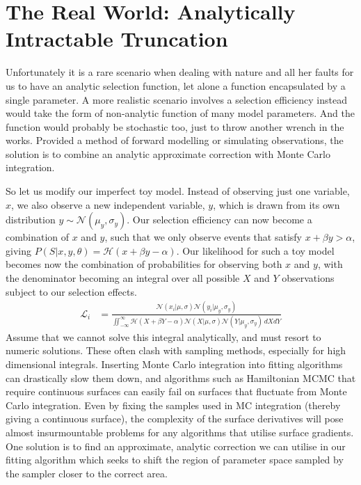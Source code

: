 \documentclass[a4paper,fleqn,usenatbib]{mnras}
\begin{document}
\section{The Real World: Analytically Intractable Truncation}
\label{sec:real}
Unfortunately it is a rare scenario when dealing with nature and all her faults for us to have an analytic selection function, let alone a function encapsulated by a single parameter. A more realistic scenario involves a selection efficiency instead would take the form of non-analytic function of many model parameters. And the function would probably be stochastic too, just to throw another wrench in the works. Provided a method of forward modelling or simulating observations, the solution is to combine an analytic approximate correction with Monte Carlo integration.

So let us modify our imperfect toy model. Instead of observing just one variable, $x$, we also observe a new independent variable, $y$, which is drawn from its own distribution $y \sim \mathcal{N}(\mu_y, \sigma_y)$. Our selection efficiency can now become a combination of $x$ and $y$, such that we only observe events that satisfy $x + \beta y > \alpha$, giving $P(S|x,y,\theta) = \mathcal{H}(x + \beta y - \alpha)$.  Our likelihood for such a toy model becomes now the combination of probabilities for observing both $x$ and $y$, with the denominator becoming an integral over all possible $X$ and $Y$ observations subject to our selection effects.
\begin{align}
\mathcal{L}_i &= \frac{ \mathcal{N}(x_i|\mu, \sigma) \mathcal{N}(y_i|\mu_y, \sigma_y)}
{\iint_{-\infty}^\infty \mathcal{H}(X + \beta Y - \alpha) \mathcal{N}(X|\mu, \sigma) \mathcal{N}(Y|\mu_y, \sigma_y)\, dX dY}
\end{align}
Assume that we cannot solve this integral analytically, and must resort to numeric solutions. These often clash with sampling methods, especially for high dimensional integrals. Inserting Monte Carlo integration into fitting algorithms can drastically slow them down, and algorithms such as Hamiltonian MCMC that require continuous surfaces can easily fail on surfaces that fluctuate from Monte Carlo integration. Even by fixing the samples used in MC integration (thereby giving a continuous surface), the complexity of the surface derivatives will pose almost insurmountable problems for any algorithms that utilise surface gradients. One solution is to find an approximate, analytic correction we can utilise in our fitting algorithm which seeks to shift the region of parameter space sampled by the sampler closer to the correct area.
\end{document}
